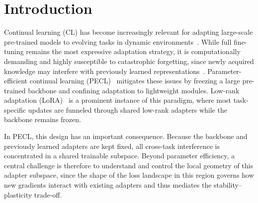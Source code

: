 \documentclass{article}
\theoremstyle{plain}
\theoremstyle{definition}
\theoremstyle{remark}
\begin{document}
\section{Introduction}

Continual learning (CL) has become increasingly relevant for adapting large-scale pre-trained models to evolving tasks in dynamic environments~\cite{PARISI201954,10444954,a2923225ea7d94e6c86faff97e23c69be,10.1145/3735633}. While full fine-tuning remains the most expressive adaptation strategy, it is computationally demanding and highly susceptible to catastrophic forgetting, since newly acquired knowledge may interfere with previously learned representations~\cite{howard2018universallanguagemodelfinetuning,doi:10.1073/pnas.1611835114,pmlr-v234-zhai24a,luo2025empiricalstudycatastrophicforgetting}. Parameter-efficient continual learning (PECL)~\cite{pmlr-v97-houlsby19a,dingParameterefficientFinetuningLargescale2023,He_2025_CVPR,NEURIPS2024_b0bc711f} mitigates these issues by freezing a large pre-trained backbone and confining adaptation to lightweight modules. Low-rank adaptation (LoRA)~\cite{hu2022lora} is a prominent instance of this paradigm, where most task-specific updates are funneled through shared low-rank adapters while the backbone remains frozen.



In PECL, this design has an important consequence. Because the backbone and previously learned adapters are kept fixed, all cross-task interference is concentrated in a shared trainable subspace. Beyond parameter efficiency, a central challenge is therefore to understand and control the local geometry of this adapter subspace, since the shape of the loss landscape in this region governs how new gradients interact with existing adapters and thus mediates the stability–plasticity trade-off.
\end{document}
